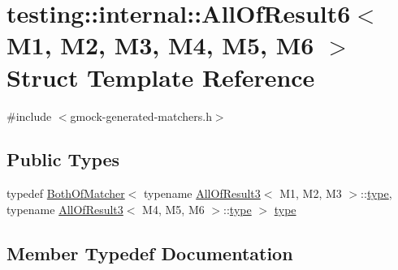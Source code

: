 \hypertarget{structtesting_1_1internal_1_1_all_of_result6}{}\section{testing\+:\+:internal\+:\+:All\+Of\+Result6$<$ M1, M2, M3, M4, M5, M6 $>$ Struct Template Reference}
\label{structtesting_1_1internal_1_1_all_of_result6}


{\ttfamily \#include $<$gmock-\/generated-\/matchers.\+h$>$}

\subsection*{Public Types}
\begin{DoxyCompactItemize}
\item 
typedef \hyperlink{classtesting_1_1internal_1_1_both_of_matcher}{Both\+Of\+Matcher}$<$ typename \hyperlink{structtesting_1_1internal_1_1_all_of_result3}{All\+Of\+Result3}$<$ M1, M2, M3 $>$\+::\hyperlink{structtesting_1_1internal_1_1_all_of_result6_a5385655911ce2c1d3fccd802c1754139}{type}, typename \hyperlink{structtesting_1_1internal_1_1_all_of_result3}{All\+Of\+Result3}$<$ M4, M5, M6 $>$\+::\hyperlink{structtesting_1_1internal_1_1_all_of_result6_a5385655911ce2c1d3fccd802c1754139}{type} $>$ \hyperlink{structtesting_1_1internal_1_1_all_of_result6_a5385655911ce2c1d3fccd802c1754139}{type}
\end{DoxyCompactItemize}


\subsection{Member Typedef Documentation}
\mbox{\label{structtesting_1_1internal_1_1_all_of_result6_a5385655911ce2c1d3fccd802c1754139}} 
